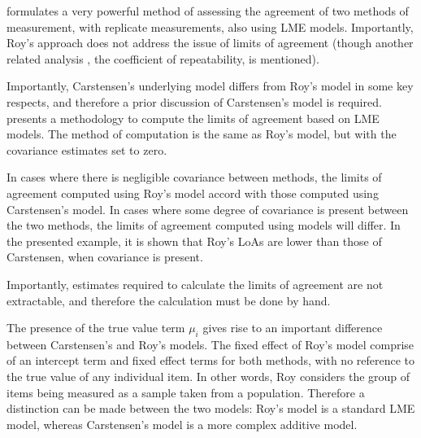 \documentclass[12pt, a4paper]{report}
\theoremstyle{plain}
\theoremstyle{definition}
\theoremstyle{remark}
\begin{document}
\citet{ARoy2009} formulates a very powerful method of assessing the agreement of two methods of measurement, with replicate measurements, also using LME models. Importantly, Roy's approach does not address the issue of limits of agreement (though another related analysis , the coefficient of repeatability, is mentioned).

Importantly, Carstensen's underlying model differs from Roy's model in some key respects, and therefore a prior discussion of Carstensen's model is required. \citet{BXC2008} presents a methodology to compute the limits of agreement based on LME models. The method of computation is the
same as Roy's model, but with the covariance estimates set to zero.

In cases where there is negligible covariance between methods, the limits of agreement computed using Roy's model accord with those computed using Carstensen's model. In cases where some degree of
covariance is present between the two methods, the limits of agreement computed using models will differ. In the presented
example, it is shown that Roy's LoAs are lower than those of Carstensen, when covariance is present.

Importantly, estimates required to calculate the limits of agreement are not extractable, and therefore the calculation must
be done by hand.





The presence of the true value term $\mu_i$ gives rise to an important difference between Carstensen's and Roy's models. The fixed effect of Roy's model comprise of an intercept term and fixed effect terms for both methods, with no reference to the true value of any individual item. In other words, Roy considers the group of items being measured as a sample taken from a population. Therefore a distinction can be made between the two models: Roy's model is a standard LME model, whereas Carstensen's model is a more complex additive model.

\end{document}
